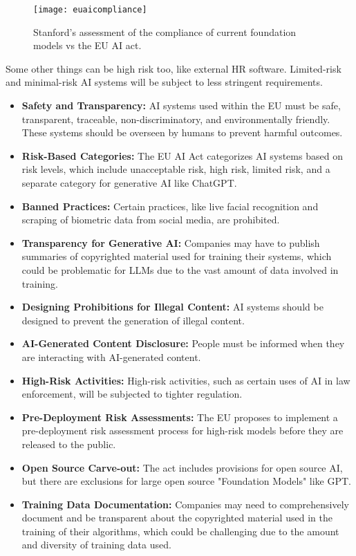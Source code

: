 \begin{figure}[H]
    \centering
    \texttt{[image: euaicompliance]}
    \caption{Stanford's assessment of the compliance of current foundation models vs the EU AI act.}
    \label{fig:euAIcompliance}
\end{figure}

Some other things can be high risk too, like external HR software. Limited-risk and minimal-risk AI systems will be subject to less stringent requirements. 
\begin{itemize}
  \item \textbf{Safety and Transparency:} AI systems used within the EU must be safe, transparent, traceable, non-discriminatory, and environmentally friendly. These systems should be overseen by humans to prevent harmful outcomes.
  \item \textbf{Risk-Based Categories:} The EU AI Act categorizes AI systems based on risk levels, which include unacceptable risk, high risk, limited risk, and a separate category for generative AI like ChatGPT.
  \item \textbf{Banned Practices:} Certain practices, like live facial recognition and scraping of biometric data from social media, are prohibited.
  \item \textbf{Transparency for Generative AI:} Companies may have to publish summaries of copyrighted material used for training their systems, which could be problematic for LLMs due to the vast amount of data involved in training.
  \item \textbf{Designing Prohibitions for Illegal Content:} AI systems should be designed to prevent the generation of illegal content.
  \item \textbf{AI-Generated Content Disclosure:} People must be informed when they are interacting with AI-generated content.
  \item \textbf{High-Risk Activities:} High-risk activities, such as certain uses of AI in law enforcement, will be subjected to tighter regulation.
  \item \textbf{Pre-Deployment Risk Assessments:} The EU proposes to implement a pre-deployment risk assessment process for high-risk models before they are released to the public.
  \item \textbf{Open Source Carve-out:} The act includes provisions for open source AI, but there are exclusions for large open source "Foundation Models" like GPT.
  \item \textbf{Training Data Documentation:} Companies may need to comprehensively document and be transparent about the copyrighted material used in the training of their algorithms, which could be challenging due to the amount and diversity of training data used.
\end{itemize}

